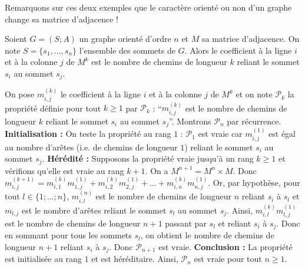 	Remarquons sur ces deux exemples que le caractère orienté ou non d'un graphe change sa matrice d'adjacence !
	
	\begin{formula}
		Soient $G = (S; A)$ un graphe orienté d'ordre $n$ et $M$ sa matrice d'adjacence. On note $S = \{s_1, \dots, s_n\}$ l'ensemble des sommets de $G$.
		\newpar
		Alors le coefficient à la ligne $i$ et à la colonne $j$ de $M^k$ est le nombre de chemins de longueur $k$ reliant le sommet $s_i$ au sommet $s_j$.
	\end{formula}
	
	\begin{demonstration}
		On pose $m_{i,j}^{(k)}$ le coefficient à la ligne $i$ et à la colonne $j$ de $M^k$ et on note $\mathcal{P}_k$ la propriété définie pour tout $k \geq 1$ par $\mathcal{P}_k$ : ``$m_{i,j}^{(k)}$ est le nombre de chemins de longueur $k$ reliant le sommet $s_i$ au sommet $s_j$''. Montrons $\mathcal{P}_n$ par récurrence.
		\newpar
		\textbf{Initialisation :} On teste la propriété au rang $1$ :
		\newpar
		$\mathcal{P}_1$ est vraie car $m_{i,j}^{(1)}$ est égal au nombre d'arêtes (i.e. de chemins de longueur $1$) reliant le sommet $s_i$ au sommet $s_j$.
		\newpar
		\textbf{Hérédité :} Supposons la propriété vraie jusqu'à un rang $k \geq 1$ et vérifions qu'elle est vraie au rang $k+1$.
		\newpar
		On a $M^{n+1} = M^{n} \times M$. Donc $m_{i,j}^{(k+1)} = m_{i,1}^{(k)}m_{1,j}^{(1)} + m_{i,2}^{(k)}m_{2,j}^{(1)} + \dots + m_{i,n}^{(k)}m_{n,j}^{(1)}$.
		\newpar
		Or, par hypothèse, pour tout $l \in \{1; \dots; n\}$, $m_{i,l}^{(n)}$ est le nombre de chemins de longueur $n$ reliant $s_i$ à $s_l$ et $m_{l,j}$ est le nombre d'arêtes reliant le sommet $s_l$ au sommet $s_j$.
		\newpar
		Ainsi, $m_{i,l}^{(k)}m_{l,j}^{(1)}$ est le nombre de chemins de longueur $n+1$ passant par $s_l$ et reliant $s_i$ à $s_j$.
		\newpar
		Donc en sommant pour tous les sommets $s_l$, on obtient le nombre de chemins de longueur $n+1$ reliant $s_i$ à $s_j$. Donc $\mathcal{P}_{n+1}$ est vraie.
		\newpar
		\textbf{Conclusion :}
		\newpar
		La propriété est initialisée au rang $1$ et est héréditaire. Ainsi, $\mathcal{P}_n$ est vraie pour tout $n \geq 1$.
	\end{demonstration}
